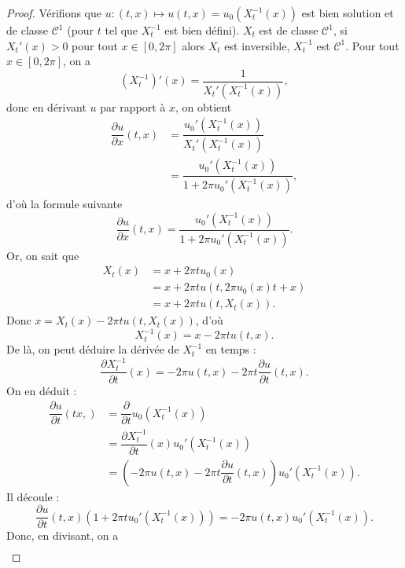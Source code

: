 \begin{proof}
Vérifions que $u : (t,x) \mapsto u(t,x) = u_0(X_t^{-1}(x))$ est bien solution et de classe $\mathcal{C}^1$ (pour $t$ tel que $X_t^{-1}$ est bien défini).
$X_t$ est de classe $\mathcal{C}^1$, si $X_t'(x)>0$ pour tout $x \in [0, 2\pi]$ alors $X_t$ est inversible, $X_t^{-1}$ est $\mathcal{C}^1$. Pour tout $x \in [0,2 \pi]$, on a
\begin{equation}
(X_t^{-1})'(x) = \dfrac{1}{X_t'(X_t^{-1}(x))},
\end{equation}
donc en dérivant $u$ par rapport à $x$, on obtient
\begin{align*}
\dfrac{\partial u}{\partial x}(t,x) & = \dfrac{u_0'(X_t^{-1}(x))}{X_t'(X_t^{-1}(x))} \\
	& = \dfrac{u_0'(X_t^{-1}(x))}{1 + 2 \pi u_0'(X_t^{-1}(x))},
\end{align*}
d'où la formule suivante 
\begin{equation}
\dfrac{\partial u}{\partial x}(t,x)=\dfrac{u_0'(X_t^{-1}(x))}{1 + 2 \pi u_0'(X_t^{-1}(x))}.
\label{eq:der_u_burgers_proof}
\end{equation}
Or, on sait que 
\begin{align*}
X_t(x) & = x + 2 \pi t u_0(x) \\
	& = x + 2 \pi t u(t,2 \pi u_0(x) t + x)\\
	& = x + 2 \pi t u(t,X_t(x)).
\end{align*}
Donc $x = X_t(x) - 2 \pi t u(t,X_t(x))$, d'où
\begin{equation}
X_t^{-1}(x) = x - 2 \pi t u(t,x).
\end{equation}
De là, on peut déduire la dérivée de $X_t^{-1}$ en temps :
\begin{equation}
\dfrac{\partial X_t^{-1}}{\partial t}(x) = - 2 \pi u(t,x) - 2 \pi t \dfrac{\partial u}{\partial t}(t,x).
\end{equation}
On en déduit :
\begin{align*}
\dfrac{\partial u}{\partial t}(tx,) & = \dfrac{\partial}{\partial t} u_0(X_t^{-1}(x)) \\
	& = \dfrac{\partial X_t^{-1}}{\partial t}(x) u_0'(X_t^{-1}(x)) \\
	& = (- 2 \pi u(t,x) - 2 \pi t \dfrac{\partial u}{\partial t}(t,x)) u_0'(X_t^{-1}(x)).
\end{align*}
Il découle :
\begin{equation}
\dfrac{\partial u}{\partial t}(t,x) (1 + 2 \pi t u_0'(X_t^{-1}(x))) = - 2 \pi u(t,x) u_0'(X_t^{-1}(x)).
\end{equation}
Donc, en divisant, on a
\begin{align*}

\end{align*}
\end{proof}
